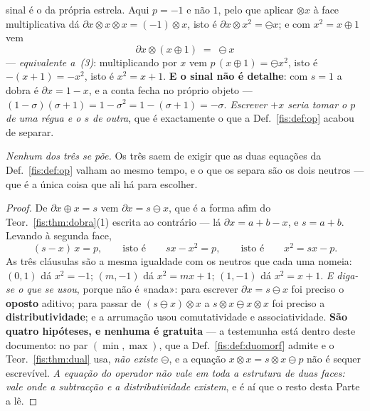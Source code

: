 \documentclass[livro.tex]{subfiles}
\begin{document}
\begin{teorema}
\begin{enumerate}
{sinal é o da própria estrela.} Aqui $p=-1$ e não $1$, pelo que aplicar $\otimes x$
à face multiplicativa dá $\partial x\otimes x\otimes x=(-1)\otimes x$, isto é
$\partial x\otimes x^{2}=\ominus x$; e com $x^{2}=x\oplus1$ vem
\[
\boxed{\;\partial x\otimes(x\oplus1)\;=\;\ominus x\;}
\]
--- \emph{equivalente a~(3)}: multiplicando por $x$ vem $p\,(x\oplus1)=\ominus x^{2}$,
isto é $-(x+1)=-x^{2}$, isto é $x^{2}=x+1$. \textbf{E o sinal não é detalhe}: com
$s=1$ a dobra é $\partial x=1-x$, e a conta fecha no próprio objeto ---
$(1-\sigma)(\sigma+1)=1-\sigma^{2}=1-(\sigma+1)=-\sigma$. \emph{Escrever $+x$
seria tomar o $p$ de uma régua e o $s$ de outra}, que é exactamente o que a
Def.~\ref{fis:def:op} acabou de separar.
\end{enumerate}
\emph{Nenhum dos três se põe.} Os três saem de exigir que as duas equações da
Def.~\ref{fis:def:op} valham ao mesmo tempo, e o que os separa são os dois
neutros --- que é a única coisa que ali há para escolher.
\end{teorema}

\begin{proof}
De $\partial x\oplus x=s$ vem $\partial x=s\ominus x$, que é a
forma afim do Teor.~\ref{fis:thm:dobra}(1) escrita ao contrário --- lá $\partial x=a+b-x$, e $s=a+b$.
Levando à segunda face,
\[
(s-x)\,x=p ,\qquad\text{isto é}\qquad sx-x^{2}=p ,\qquad\text{isto é}\qquad x^{2}=sx-p .
\]
As três cláusulas são a mesma igualdade com os neutros que cada uma nomeia:
$(0,1)$ dá $x^{2}=-1$; $(m,-1)$ dá $x^{2}=mx+1$; $(1,-1)$ dá $x^{2}=x+1$.
\emph{E diga-se o que se usou}, porque não é «nada»: para escrever
$\partial x=s\ominus x$ foi preciso o \textbf{oposto} aditivo; para passar de
$(s\ominus x)\otimes x$ a $s\otimes x\ominus x\otimes x$ foi preciso a
\textbf{distributividade}; e a arrumação usou comutatividade e
associatividade. \textbf{São quatro hipóteses, e nenhuma é gratuita} --- a
testemunha está dentro deste documento: no par $(\min,\max)$, que a
Def.~\ref{fis:def:duomorf} admite e o Teor.~\ref{fis:thm:dual} usa,
\emph{não existe $\ominus$}, e a equação $x\otimes x=s\otimes x\ominus p$ não é
sequer escrevível. \emph{A equação do operador não vale em toda a estrutura de
duas faces: vale onde a subtracção e a distributividade existem}, e é aí que o
resto desta Parte a lê.
\end{proof}
\end{document}
